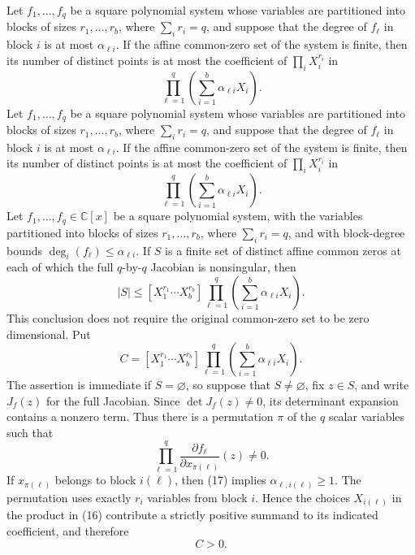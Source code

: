 Let \(f_1,\ldots,f_q\) be a square polynomial system whose variables are partitioned into blocks of sizes \(r_1,\ldots,r_b\), where \(\sum_i r_i=q\), and suppose that the degree of \(f_\ell\) in block \(i\) is at most \(\alpha_{\ell i}\). If the affine common-zero set of the system is finite, then its number of distinct points is at most the coefficient of \(\prod_i X_i^{r_i}\) in
\[
 \prod_{\ell=1}^{q}\left(\sum_{i=1}^{b}\alpha_{\ell i}X_i\right).
\]
Let \(f_1,\ldots,f_q\) be a square polynomial system whose variables are partitioned into blocks of sizes \(r_1,\ldots,r_b\), where \(\sum_i r_i=q\), and suppose that the degree of \(f_\ell\) in block \(i\) is at most \(\alpha_{\ell i}\). If the affine common-zero set of the system is finite, then its number of distinct points is at most the coefficient of \(\prod_i X_i^{r_i}\) in
\[
 \prod_{\ell=1}^{q}\left(\sum_{i=1}^{b}\alpha_{\ell i}X_i\right).
\]
Let \(f_1,\ldots,f_q\in\mathbb C[x]\) be a square polynomial system, with the variables partitioned into blocks of sizes \(r_1,\ldots,r_b\), where \(\sum_i r_i=q\), and with block-degree bounds \(\deg_i(f_\ell)\leq\alpha_{\ell i}\). If \(S\) is a finite set of distinct affine common zeros at each of which the full \(q\)-by-\(q\) Jacobian is nonsingular, then
\[
 |S|\leq
 [X_1^{r_1}\cdots X_b^{r_b}]
 \prod_{\ell=1}^{q}\left(\sum_{i=1}^{b}\alpha_{\ell i}X_i\right).
\]
This conclusion does not require the original common-zero set to be zero dimensional.
Put
\[
 C=[X_1^{r_1}\cdots X_b^{r_b}]
 \prod_{\ell=1}^{q}\left(\sum_{i=1}^{b}\alpha_{\ell i}X_i\right).
\tag{16}
\]
The assertion is immediate if \(S=\varnothing\), so suppose that \(S\ne\varnothing\), fix \(z\in S\), and write \(J_f(z)\) for the full Jacobian. Since \(\det J_f(z)\ne0\), its determinant expansion contains a nonzero term. Thus there is a permutation \(\pi\) of the \(q\) scalar variables such that
\[
 \prod_{\ell=1}^{q}
 \frac{\partial f_\ell}{\partial x_{\pi(\ell)}}(z)\ne0.
\tag{17}
\]
If \(x_{\pi(\ell)}\) belongs to block \(i(\ell)\), then (17) implies \(\alpha_{\ell,i(\ell)}\geq1\). The permutation uses exactly \(r_i\) variables from block \(i\). Hence the choices \(X_{i(\ell)}\) in the product in (16) contribute a strictly positive summand to its indicated coefficient, and therefore
\[
 C>0.
\tag{18}
\]

